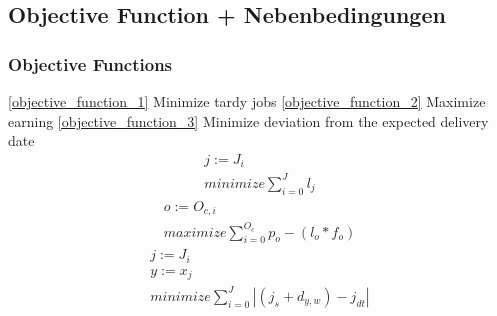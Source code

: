 \documentclass[a4paper,12pt,twoside]{scrreprt}
\begin{document}
\subsection*{Objective Function + Nebenbedingungen}
\subsubsection*{Objective Functions}
\begin{flushleft}
\autoref{objective_function_1} Minimize tardy jobs\linebreak
\autoref{objective_function_2} Maximize earning\linebreak
\autoref{objective_function_3} Minimize deviation from the expected delivery date\linebreak
	\begin{equation}
	\label{objective_function_1}
	\begin{split}
		j := J_{i} \\
		minimize \sum_{i=0}^{J}l_{j} 
	\end{split}
	\end{equation}
	\begin{equation}
	\label{objective_function_2}
	\begin{split}
		o := O_{c,i} \\
		maximize \sum_{i=0}^{O_{c}}p_{o} - (l_{o} * f_{o})
	\end{split}
	\end{equation}
	\begin{equation}
	\label{objective_function_3}
	\begin{split}
		j := J_{i} \\
		y := x_{j} \\
		minimize \sum_{i=0}^{J} |(j_{s} + d_{y,w}) - j_{dt}|
	\end{split}
	\end{equation}

\end{flushleft}
\end{document}
